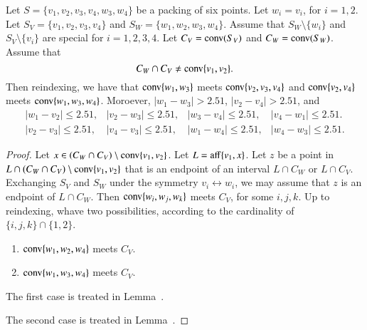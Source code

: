 \begin{tarskidata}
\begin{tarski}
\begin{lemma}
Let $S=\{v_1,v_2,v_3,v_4,w_3,w_4\}$ be a packing of six points.
Let $w_i=v_i$, for $i=1,2$.  Let $S_V=\{v_1,v_2,v_3,v_4\}$
and $S_W=\{w_1,w_2,w_3,w_4\}$. 
Assume that $S_W\setminus \{w_i\}$ and $S_V\setminus\{v_i\}$
are special for $i=1,2,3,4$.
 Let $C_V = {\operatorname{conv}}(S_V)$ and
$C_W={\operatorname{conv}}(S_W)$.  Assume that 
   $$
   C_W \cap C_V \ne {\operatorname{conv}}\{v_1,v_2\}.
   $$
Then reindexing,
we have that ${\operatorname{conv}}\{w_1,w_3\}$ meets ${\operatorname{conv}}\{v_2,v_3,v_4\}$
and ${\operatorname{conv}}\{v_2,v_4\}$ meets ${\operatorname{conv}}\{w_1,w_3,w_4\}$.  Moroever,
$|w_1-w_3|>2.51$, $|v_2-v_4|>2.51$,
and
  $$
  \begin{array}{llll}
  |w_1-v_2|\le 2.51,&|v_2-w_3|\le 2.51,& |w_3-v_4|\le 2.51,&
  |v_4-w_1|\le 2.51.\\
  |v_2-v_3|\le 2.51,&|v_4-v_3|\le 2.51,& |w_1-w_4|\le 2.51,&
  |w_4-w_3|\le 2.51.
  \end{array}
  $$
\end{lemma}

\begin{proof}
Let $x\in (C_W\cap C_V)\setminus {\operatorname{conv}}\{v_1,v_2\}$.
Let $L={\operatorname{aff}}\{v_1,x\}$.  Let $z$ be a point in 
$L\cap (C_W\cap C_V)\setminus{\operatorname{conv}}\{v_1,v_2\}$ that is
an endpoint of an interval $L\cap C_W$ or $L\cap C_V$.   Exchanging
$S_V$ and $S_W$ under the symmetry $v_i\leftrightarrow w_i$,
we may assume that $z$ is an endpoint of $L\cap C_W$.  
Then ${\operatorname{conv}}\{w_i,w_j,w_k\}$ meets $C_V$, for some $i,j,k$.
Up to reindexing, 
whave two possibilities, according to the cardinality of
$\{i,j,k\}\cap\{1,2\}$.
\begin{enumerate}
  \item ${\operatorname{conv}}\{w_1,w_2,w_4\}$ meets $C_V$.
  \item ${\operatorname{conv}}\{w_1,w_3,w_4\}$ meets $C_V$.
\end{enumerate}

The first case is treated in Lemma~.

The second case is treated in Lemma~.
\end{proof}
\end{tarski}








\begin{tarski}


\end{tarski}
\end{tarskidata}
